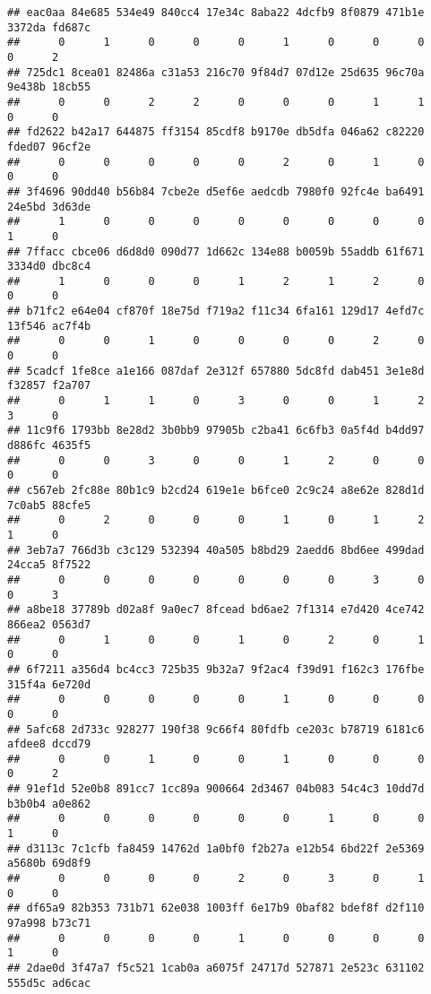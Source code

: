 \documentclass[
]{article}
\begin{document}
\begin{verbatim}
## eac0aa 84e685 534e49 840cc4 17e34c 8aba22 4dcfb9 8f0879 471b1e 3372da fd687c 
##      0      1      0      0      0      1      0      0      0      0      2 
## 725dc1 8cea01 82486a c31a53 216c70 9f84d7 07d12e 25d635 96c70a 9e438b 18cb55 
##      0      0      2      2      0      0      0      1      1      0      0 
## fd2622 b42a17 644875 ff3154 85cdf8 b9170e db5dfa 046a62 c82220 fded07 96cf2e 
##      0      0      0      0      0      2      0      1      0      0      0 
## 3f4696 90dd40 b56b84 7cbe2e d5ef6e aedcdb 7980f0 92fc4e ba6491 24e5bd 3d63de 
##      1      0      0      0      0      0      0      0      0      1      0 
## 7ffacc cbce06 d6d8d0 090d77 1d662c 134e88 b0059b 55addb 61f671 3334d0 dbc8c4 
##      1      0      0      0      1      2      1      2      0      0      0 
## b71fc2 e64e04 cf870f 18e75d f719a2 f11c34 6fa161 129d17 4efd7c 13f546 ac7f4b 
##      0      0      1      0      0      0      0      2      0      0      0 
## 5cadcf 1fe8ce a1e166 087daf 2e312f 657880 5dc8fd dab451 3e1e8d f32857 f2a707 
##      0      1      1      0      3      0      0      1      2      3      0 
## 11c9f6 1793bb 8e28d2 3b0bb9 97905b c2ba41 6c6fb3 0a5f4d b4dd97 d886fc 4635f5 
##      0      0      3      0      0      1      2      0      0      0      0 
## c567eb 2fc88e 80b1c9 b2cd24 619e1e b6fce0 2c9c24 a8e62e 828d1d 7c0ab5 88cfe5 
##      0      2      0      0      0      1      0      1      2      1      0 
## 3eb7a7 766d3b c3c129 532394 40a505 b8bd29 2aedd6 8bd6ee 499dad 24cca5 8f7522 
##      0      0      0      0      0      0      0      3      0      0      3 
## a8be18 37789b d02a8f 9a0ec7 8fcead bd6ae2 7f1314 e7d420 4ce742 866ea2 0563d7 
##      0      1      0      0      1      0      2      0      1      0      0 
## 6f7211 a356d4 bc4cc3 725b35 9b32a7 9f2ac4 f39d91 f162c3 176fbe 315f4a 6e720d 
##      0      0      0      0      0      1      0      0      0      0      0 
## 5afc68 2d733c 928277 190f38 9c66f4 80fdfb ce203c b78719 6181c6 afdee8 dccd79 
##      0      0      1      0      0      1      0      0      0      0      2 
## 91ef1d 52e0b8 891cc7 1cc89a 900664 2d3467 04b083 54c4c3 10dd7d b3b0b4 a0e862 
##      0      0      0      0      0      0      1      0      0      1      0 
## d3113c 7c1cfb fa8459 14762d 1a0bf0 f2b27a e12b54 6bd22f 2e5369 a5680b 69d8f9 
##      0      0      0      0      2      0      3      0      1      0      0 
## df65a9 82b353 731b71 62e038 1003ff 6e17b9 0baf82 bdef8f d2f110 97a998 b73c71 
##      0      0      0      0      1      0      0      0      0      1      0 
## 2dae0d 3f47a7 f5c521 1cab0a a6075f 24717d 527871 2e523c 631102 555d5c ad6cac 

\end{verbatim}
\end{document}
